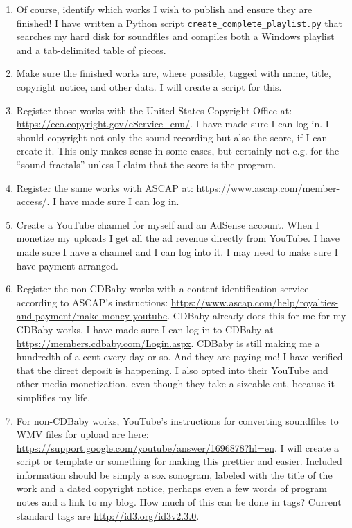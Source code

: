 \documentclass[english,11pt,letterpaper,onecolumn]{scrartcl}
\begin{document}
\begin{enumerate}
\item Of course, identify which works I wish to publish and ensure they are finished! I have written a Python script \texttt{create\_complete\_playlist.py} that searches my hard disk for soundfiles and compiles both a Windows playlist and a tab-delimited table of pieces.
\item Make sure the finished works are, where possible, tagged with name, title, copyright notice, and other data. I will create a script for this.
\item Register those works with the United States Copyright Office at: \url{https://eco.copyright.gov/eService_enu/}. I have made sure I can log in. I should copyright not only the sound recording but also the score, if I can create it. This only makes sense in some cases, but certainly not e.g. for the ``sound fractals'' unless I claim that the score is the program.
\item Register the same works with ASCAP at: \url{https://www.ascap.com/member-access/}. I have made sure I can log in.
\item Create a YouTube channel for myself and an AdSense account. When I monetize my uploads I get all the ad revenue directly from YouTube. I have made sure I have a channel and I can log into it. I may need to make sure I have payment arranged.
\item Register the non-CDBaby works with a content identification service according to ASCAP's instructions: \url{https://www.ascap.com/help/royalties-and-payment/make-money-youtube}. CDBaby already does this for me for my CDBaby works. I have made sure I can log in to CDBaby at \url{https://members.cdbaby.com/Login.aspx}. CDBaby is still making me a hundredth of a cent every day or so. And they are paying me! I have verified that the direct deposit is happening. I also opted into their YouTube and other media monetization, even though they take a sizeable cut, because it simplifies my life.
\item For non-CDBaby works, YouTube's instructions for converting soundfiles to WMV files for upload are here: \url{https://support.google.com/youtube/answer/1696878?hl=en}. I will create a script or template or something for making this prettier and easier. Included information should be simply a sox sonogram, labeled with the title of the work and a dated copyright notice, perhaps even a few words of program notes and a link to my blog.
\noindent How much of this can be done in tags? Current standard tags are \url{http://id3.org/id3v2.3.0}.
\end{enumerate}
\end{document}
